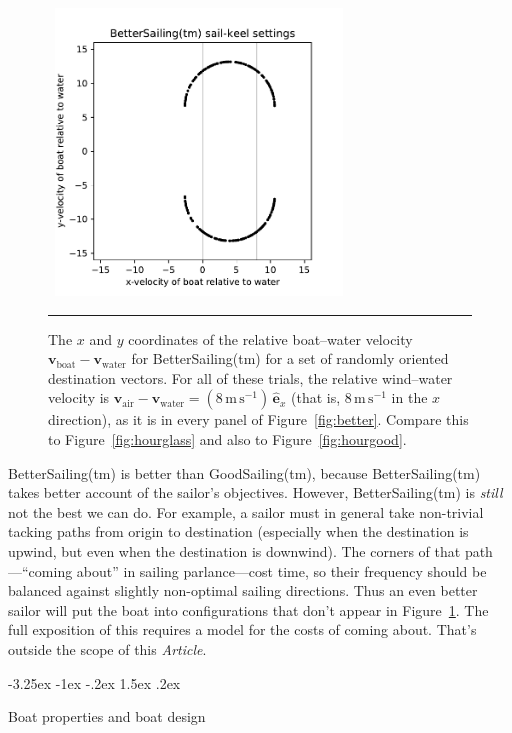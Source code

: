 \documentclass[letterpaper]{article}
\makeatletter
\renewcommand{\vec}[1]{\boldsymbol{#1}}
\newcommand{\uvec}{\vec{\hat{e}}}
\newcommand{\air}{\text{air}}
\newcommand{\water}{\text{water}}
\newcommand{\boat}{\text{boat}}
\newcommand{\vair}{\vec{v}_\air}
\newcommand{\vwater}{\vec{v}_\water}
\newcommand{\vboat}{\vec{v}_\boat}
\newcommand{\mps}{\mathrm{m\,s^{-1}}}
\newcommand{\documentname}{\textsl{Article}}
\newcommand{\figref}[1]{Figure~\ref{#1}}
\renewcommand\section{\@startsection {section}{1}{\z@}%
  {-3.25ex \@plus -1ex \@minus -.2ex}%
  {1.5ex \@plus .2ex}%
  {\raggedright\normalfont\large\bfseries}}
\newcommand{\figurerule}{\rule[1ex]{\textwidth}{0.2pt}}
\makeatother
\begin{document}
\begin{figure}[t!]
  ~\hfill\includegraphics[width=3in]{hourglass-better.pdf}\hfill~
  \caption{The $x$ and $y$ coordinates of the relative boat--water velocity $\vboat-\vwater$ for BetterSailing(tm) for a set of randomly oriented destination vectors.
  For all of these trials, the relative wind--water velocity is $\vair-\vwater=(8\,\mps)\,\uvec_x$ (that is, $8\,\mps$ in the $x$ direction), as it is in every panel of \figref{fig:better}.
  Compare this to \figref{fig:hourglass} and also to \figref{fig:hourgood}.\label{fig:hourbetter}}
  \figurerule
\end{figure}

BetterSailing(tm) is better than GoodSailing(tm), because BetterSailing(tm) takes better account of the sailor's objectives.
However, BetterSailing(tm) is \emph{still} not the best we can do.
For example, a sailor must in general take non-trivial tacking paths from origin to destination (especially when the destination is upwind, but even when the destination is downwind).
The corners of that path---``coming about'' in sailing parlance---cost time, so their frequency should be balanced against slightly non-optimal sailing directions.
Thus an even better sailor will put the boat into configurations that don't appear in \figref{fig:hourbetter}.
The full exposition of this requires a model for the costs of coming about.
That's outside the scope of this \documentname.

\section{Boat properties and boat design}\label{sec:design}
\end{document}
